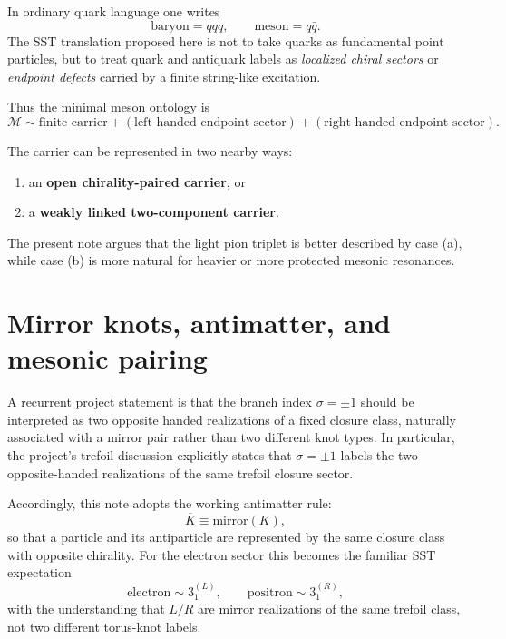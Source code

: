\documentclass[11pt,a4paper]{article}
\begin{document}
In ordinary quark language one writes
\[
\text{baryon} = qqq,
\qquad
\text{meson} = q\bar q.
\]
The SST translation proposed here is not to take quarks as fundamental point particles, but to treat quark and antiquark labels as \emph{localized chiral sectors} or \emph{endpoint defects} carried by a finite string-like excitation.

Thus the minimal meson ontology is
\begin{equation}
\mathcal{M}
\sim
\text{finite carrier} + (\text{left-handed endpoint sector}) + (\text{right-handed endpoint sector}).
\label{eq:mesonontology}
\end{equation}

The carrier can be represented in two nearby ways:
\begin{enumerate}[label=(\alph*)]
    \item an \textbf{open chirality-paired carrier}, or
    \item a \textbf{weakly linked two-component carrier}.
\end{enumerate}
The present note argues that the light pion triplet is better described by case (a), while case (b) is more natural for heavier or more protected mesonic resonances.

\section{Mirror knots, antimatter, and mesonic pairing}
A recurrent project statement is that the branch index \(\sigma=\pm1\) should be interpreted as two opposite handed realizations of a fixed closure class, naturally associated with a mirror pair rather than two different knot types. In particular, the project's trefoil discussion explicitly states that \(\sigma=\pm1\) labels the two opposite-handed realizations of the same trefoil closure sector.

Accordingly, this note adopts the working antimatter rule:
\begin{equation}
\overline{K} \equiv \text{mirror}(K),
\label{eq:mirrorantimatter}
\end{equation}
so that a particle and its antiparticle are represented by the same closure class with opposite chirality. For the electron sector this becomes the familiar SST expectation
\begin{equation}
\text{electron} \sim 3_1^{(L)},
\qquad
\text{positron} \sim 3_1^{(R)},
\end{equation}
with the understanding that \(L/R\) are mirror realizations of the same trefoil class, not two different torus-knot labels.
\end{document}
